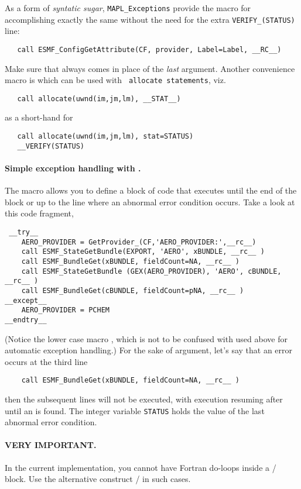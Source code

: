 As a form of {\em syntatic sugar}, {\tt MAPL\_Exceptions} provide the
macro  for accomplishing exactly the same without the need for
the extra {\tt VERIFY\_(STATUS)} line:
\begin{verbatim}
   call ESMF_ConfigGetAttribute(CF, provider, Label=Label, __RC__)
\end{verbatim}
Make sure that  always comes in place of the {\em last} argument.
Another convenience macro is  which can be used with {\tt
  allocate statements}, viz.
\begin{verbatim}
   call allocate(uwnd(im,jm,lm), __STAT__)
\end{verbatim}
as a short-hand for
\begin{verbatim}
   call allocate(uwnd(im,jm,lm), stat=STATUS)
   __VERIFY(STATUS)
\end{verbatim}



\paragraph{Simple exception handling with . }

The  macro allows you to define a block of code that executes
until the end of the block or up to the line where an abnormal error
condition occurs. Take a look at this code fragment,
\begin{verbatim}
 __try__
    AERO_PROVIDER = GetProvider_(CF,'AERO_PROVIDER:',__rc__)
    call ESMF_StateGetBundle(EXPORT, 'AERO', xBUNDLE, __rc__ )
    call ESMF_BundleGet(xBUNDLE, fieldCount=NA, __rc__ )
    call ESMF_StateGetBundle (GEX(AERO_PROVIDER), 'AERO', cBUNDLE, __rc__ )
    call ESMF_BundleGet(cBUNDLE, fieldCount=pNA, __rc__ )
__except__
    AERO_PROVIDER = PCHEM
__endtry__
\end{verbatim}
(Notice the lower case macro , which is not to be confused with
 used above for automatic exception handling.) For the sake of
argument, let's say that an error occurs at the third line
\begin{verbatim}
    call ESMF_BundleGet(xBUNDLE, fieldCount=NA, __rc__ )
\end{verbatim}
then the subsequent lines will not be executed, with execution
resuming after  until an  is found. The integer
variable {\tt STATUS} holds the value of the last abnormal error condition.

\paragraph{VERY IMPORTANT.} In the current implementation, you cannot
have Fortran do-loops inside a / block. Use the
alternative construct / in such cases.

